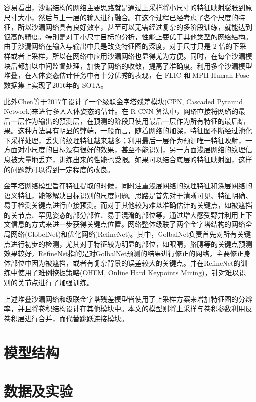 容易看出，沙漏结构的网络主要思路就是通过上采样将小尺寸的特征映射膨胀到原尺寸大小，然后与上一层的输入进行融合。在这个过程已经考虑了各个尺度的特征，所以沙漏网络具有良好效率，甚至可以无需经过复杂的多阶段训练，就能达到很高的精度。特别是对于小尺寸目标的分析，性能上要优于其他类型的网络结构。由于沙漏网络在输入与输出中只是改变特征图的深度，对于尺寸只是 2 倍的下采样或者上采样，所以在网络中应用沙漏网络也显得尤为方便。同时，在每个沙漏模块后都加以中间监督处理，加快了网络的收敛，提高了准确度。利用多个沙漏模型堆叠，在人体姿态估计任务中有十分优秀的表现，在 FLIC 和 MPII Human Pose 数据集上实现了2016年的 SOTA。

此外Chen等于2017年设计了一个级联金字塔残差模块(CPN, Cascaded  Pyramid Network)来进行多人人体姿态的估计。在 R-CNN 算法中，网络直接将网络的最后一层作为输出的预测层，在预测的阶段只使用最后一层作为所有特征的最后结果。这种方法具有明显的弊端，一般而言，随着网络的加深，特征图不断经过池化下采样处理，丢失的纹理特征越来越多；利用最后一层作为预测唯一特征映射，一方面对小尺度的目标没有很好的效果，甚至不能识别，另一方面浅层网络的纹理信息被大量地丢弃，训练出来的性能也受限。如果可以结合底层的特征映射图，这样的问题就可以得到一定程度的改良。

金字塔网络模型旨在特征提取的时候，同时注重浅层网络的纹理特征和深层网络的语义特征，能够解决目标识别的尺度问题。思路是首先对于清晰可见、特征明确、易于检测关键点进行直接预测。而对于其他较为难以准确估计的关键点，如被遮挡的关节点、罕见姿态的部分部位、易于混淆的部位等，通过增大感受野并利用上下文信息的方式来进一步获得关键点位置。网络整体级联了两个金字塔结构的网络全局网络(GlobelNet)和优化网络(RefineNet)。其中，GolbalNet负责首先对所有关键点进行初步的检测，尤其对于特征较为明显的部位，如眼睛，胳膊等的关键点预测效果较好。RefineNet指的是对GolbalNet预测的结果进行修正的网络。主要修正身体部位中因为被遮挡，或者有复杂背景的误差较大的关键点。并在RefineNet的训练中使用了难例挖掘策略(OHEM, Online Hard Keypoints Mining)，针对难以识别的关节点进行了加强训练。

上述堆叠沙漏网络和级联金字塔残差模型皆使用了上采样方案来增加特征图的分辨率，并且将卷积结构设计在其他模块中。本文的模型则将上采样与卷积参数利用反卷积层进行合并，而代替跳跃连接模块。



\section{模型结构}
\section{数据及实验}
